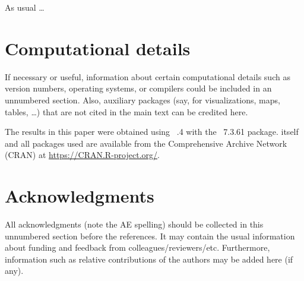 \documentclass[article]{jss}
\begin{document}
\begin{leftbar}
As usual \dots
\end{leftbar}



\section*{Computational details}

\begin{leftbar}
If necessary or useful, information about certain computational details
such as version numbers, operating systems, or compilers could be included
in an unnumbered section. Also, auxiliary packages (say, for visualizations,
maps, tables, \dots) that are not cited in the main text can be credited here.
\end{leftbar}

The results in this paper were obtained using
~.4 with the
~7.3.61 package.  itself
and all packages used are available from the Comprehensive
 Archive Network (CRAN) at
\url{https://CRAN.R-project.org/}.


\section*{Acknowledgments}

\begin{leftbar}
All acknowledgments (note the AE spelling) should be collected in this
unnumbered section before the references. It may contain the usual information
about funding and feedback from colleagues/reviewers/etc. Furthermore,
information such as relative contributions of the authors may be added here
(if any).
\end{leftbar}






\end{document}
